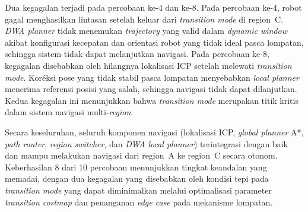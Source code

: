Dua kegagalan terjadi pada percobaan ke-4 dan ke-8. Pada percobaan ke-4,
robot gagal menghasilkan lintasan setelah keluar dari \emph{transition mode}
di region~C. \emph{DWA planner} tidak menemukan \emph{trajectory} yang valid
dalam \emph{dynamic window} akibat konfigurasi kecepatan dan orientasi robot
yang tidak ideal pasca lompatan, sehingga sistem tidak dapat melanjutkan
navigasi. Pada percobaan ke-8, kegagalan disebabkan oleh hilangnya lokalisasi
ICP setelah melewati \emph{transition mode}. Koréksi pose yang tidak stabil
pasca lompatan menyebabkan \emph{local planner} menerima referensi posisi
yang salah, sehingga navigasi tidak dapat dilanjutkan. Kedua kegagalan ini
menunjukkan bahwa \emph{transition mode} merupakan titik kritis dalam sistem
navigasi multi-\emph{region}.

Secara keseluruhan, seluruh komponen navigasi (lokalisasi ICP, \emph{global
planner} A*, \emph{path router}, \emph{region switcher}, dan \emph{DWA local
planner}) terintegrasi dengan baik dan mampu melakukan navigasi dari region~A
ke region~C secara otonom. Keberhasilan 8 dari 10 percobaan menunjukkan
tingkat keandalan yang memadai, dengan dua kegagalan yang disebabkan oleh
kondisi tepi pada \emph{transition mode} yang dapat diminimalkan melalui
optimalisasi parameter \emph{transition costmap} dan penanganan \emph{edge
case} pada mekanisme lompatan.